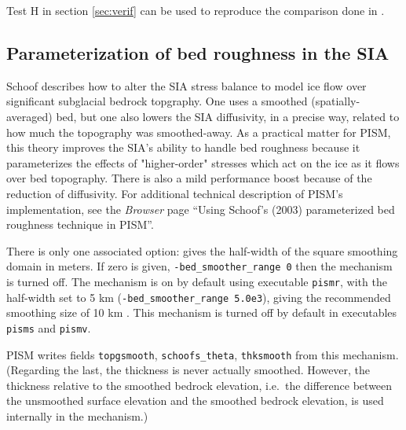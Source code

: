 Test H in section \ref{sec:verif} can be used to reproduce the comparison done in \cite{BLKfastearth}.


\subsection{Parameterization of bed roughness in the SIA} \label{subsect:bedsmooth} 

Schoof \cite{Schoofbasaltopg2003} describes how to alter the SIA stress balance to model ice flow over significant subglacial bedrock topgraphy.  One uses a smoothed (spatially-averaged) bed, but one also lowers the SIA diffusivity, in a precise way, related to how much the topography was smoothed-away.  As a practical matter for PISM, this theory improves the SIA's ability to handle bed roughness because it parameterizes the effects of "higher-order" stresses which act on the ice as it flows over bed topography.  There is also a mild performance boost because of the reduction of diffusivity.  For additional technical description of PISM's implementation, see the \emph{Browser} page ``Using Schoof's (2003) parameterized bed roughness technique in PISM''.

There is only one associated option:  gives the half-width of the square smoothing domain in meters.  If zero is given, \texttt{-bed_smoother_range 0} then the mechanism is turned off.  The mechanism is on by default using executable \texttt{pismr}, with the half-width set to 5 km (\texttt{-bed_smoother_range 5.0e3}), giving the recommended smoothing size of 10 km \cite{Schoofbasaltopg2003}.  This mechanism is turned off by default in executables \texttt{pisms} and \texttt{pismv}.

PISM writes fields \texttt{topgsmooth}, \texttt{schoofs_theta}, \texttt{thksmooth} from this mechanism.  (Regarding the last, the thickness is never actually smoothed.  However, the thickness relative to the smoothed bedrock elevation, i.e.~the difference between the unsmoothed surface elevation and the smoothed bedrock elevation, is used internally in the mechanism.)



